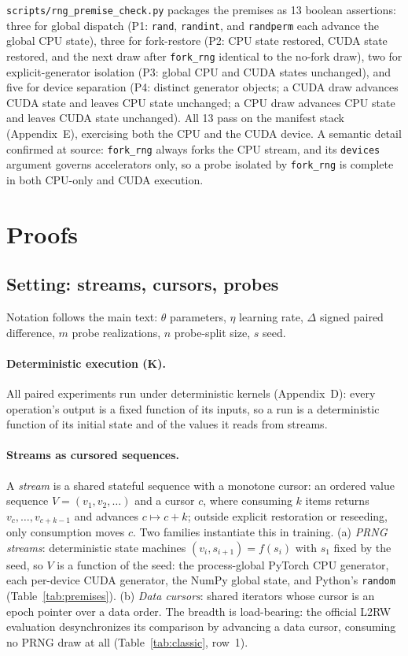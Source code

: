 \documentclass[10pt,letterpaper]{article}
\theoremstyle{remark}
\newcommand{\code}[1]{\texttt{#1}}
\begin{document}
\code{scripts/rng\_premise\_check.py} packages the premises as 13 boolean
assertions: three for global dispatch (P1: \code{rand},
\code{randint}, and \code{randperm} each advance the global CPU state),
three for fork-restore (P2: CPU state restored, CUDA state restored, and
the next draw after \code{fork\_rng} identical to the no-fork draw), two
for explicit-generator isolation (P3: global CPU and CUDA states
unchanged), and five for device separation (P4: distinct generator
objects; a CUDA draw advances CUDA state and leaves CPU state unchanged;
a CPU draw advances CPU state and leaves CUDA state unchanged). All 13
pass on the manifest stack (Appendix~E), exercising both the CPU and the
CUDA device. A semantic detail confirmed at source: \code{fork\_rng}
always forks the CPU stream, and its \code{devices} argument governs
accelerators only, so a probe isolated by \code{fork\_rng} is complete in
both CPU-only and CUDA execution.

\section{Proofs}
\label{sec:proofs}

\subsection{Setting: streams, cursors, probes}
\label{sec:setting}

Notation follows the main text: $\theta$ parameters, $\eta$ learning
rate, $\Delta$ signed paired difference, $m$ probe realizations, $n$
probe-split size, $s$ seed.

\paragraph{Deterministic execution (K).}
All paired experiments run under deterministic kernels (Appendix~D):
every operation's output is a fixed function of its inputs, so a run is a
deterministic function of its initial state and of the values it reads
from streams.

\paragraph{Streams as cursored sequences.}
A \emph{stream} is a shared stateful sequence with a monotone cursor: an
ordered value sequence $V = (v_1, v_2, \dots)$ and a cursor $c$, where
consuming $k$ items returns $v_c, \dots, v_{c+k-1}$ and advances
$c \mapsto c + k$; outside explicit restoration or reseeding,
only consumption moves $c$. Two families instantiate
this in training. (a) \emph{PRNG streams}: deterministic state machines
$(v_i, s_{i+1}) = f(s_i)$ with $s_1$ fixed by the seed, so $V$ is a
function of the seed: the process-global PyTorch CPU generator, each
per-device CUDA generator, the NumPy global state, and Python's
\code{random} (Table~\ref{tab:premises}). (b) \emph{Data cursors}: shared
iterators whose cursor is an epoch pointer over a data order. The breadth
is load-bearing: the official L2RW evaluation desynchronizes its
comparison by advancing a data cursor, consuming no PRNG draw at all
(Table~\ref{tab:classic}, row~1).
\end{document}
